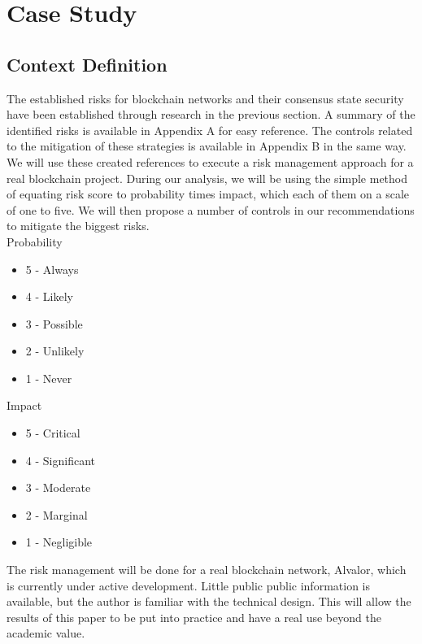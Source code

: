 \documentclass[12pt,a4paper]{article}
\begin{document}
\section{Case Study}

\subsection{Context Definition}

The established risks for blockchain networks and their consensus state security have been established through research in the previous section. A summary of the identified risks is available in Appendix A for easy reference. The controls related to the mitigation of these strategies is available in Appendix B in the same way.\\

We will use these created references to execute a risk management approach for a real blockchain project. During our analysis, we will be using the simple method of equating risk score to probability times impact, which each of them on a scale of one to five. We will then propose a number of controls in our recommendations to mitigate the biggest risks.\\

Probability
\begin{itemize}
  \item 5 - Always
  \item 4 - Likely
  \item 3 - Possible
  \item 2 - Unlikely
  \item 1 - Never
\end{itemize}

Impact
\begin{itemize}
  \item 5 - Critical
  \item 4 - Significant
  \item 3 - Moderate
  \item 2 - Marginal
  \item 1 - Negligible
\end{itemize}

The risk management will be done for a real blockchain network, Alvalor, which is currently under active development. Little public public information is available, but the author is familiar with the technical design. This will allow the results of this paper to be put into practice and have a real use beyond the academic value.\\
\end{document}
